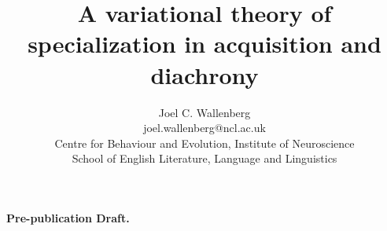 \documentclass{artikel3}
\begin{document}
\title{A variational theory of specialization in acquisition and diachrony}

\author{Joel C. Wallenberg \vspace*{3mm} \\ \small{joel.wallenberg@ncl.ac.uk} \\ \small{Centre for Behaviour and Evolution, Institute of Neuroscience}\\
\small{School of English Literature, Language and Linguistics}}




\date{}



\maketitle

\textbf{Pre-publication Draft.}\\
\end{document}
